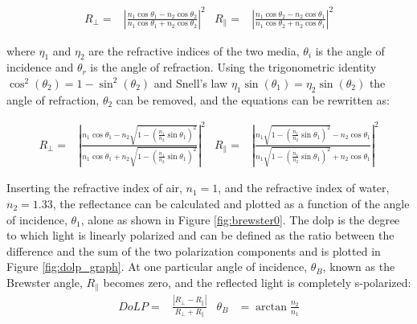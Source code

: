 \begin{align}
    R_\perp =     & \left|{\frac {n_{1}\cos \theta _1-n_{2}\cos \theta _2}{n_{1}\cos \theta _1+n_{2}\cos \theta _2}}\right|^{2}
                  & 
    R_\parallel = & \left|{\frac {n_{1}\cos \theta _2-n_{2}\cos \theta _1}{n_{1}\cos \theta _2+n_{2}\cos \theta _1}}\right|^{2}
\end{align}

where $\eta_1$ and $\eta_2$ are the refractive indices of the two media,
$\theta_i$ is the angle of incidence and $\theta_r$ is the angle of refraction.
Using the trigonometric identity $ \cos^2{\left(\theta_2 \right)} = 1- \sin^2{\left(\theta_2 \right)}$ and Snell's law $\eta_1 \sin{\left(\theta_1 \right)} = \eta_2 \sin{\left(\theta_2 \right)}$ the angle of refraction, $\theta_2$ can be removed, and the equations can be rewritten as:

\begin{align}
    R_\perp =     & \left|{\frac {n_{1}\cos \theta _1-n_{2}{\sqrt {1-\left({\frac {n_{1}}{n_{2}}}\sin \theta _1\right)^{2}}}}{n_{1}\cos \theta _1+n_{2}{\sqrt {1-\left({\frac {n_{1}}{n_{2}}}\sin \theta _1\right)^{2}}}}}\right|^{2}
                  & 
    R_\parallel = & \left|{\frac {n_{1}{\sqrt {1-\left({\frac {n_{1}}{n_{2}}}\sin \theta _1\right)^{2}}}-n_{2}\cos \theta _1}{n_{1}{\sqrt {1-\left({\frac {n_{1}}{n_{2}}}\sin \theta _1\right)^{2}}}+n_{2}\cos \theta _1}}\right|^{2}
\end{align}


Inserting the refractive index of air, $n_1 = 1$, and the refractive index of water, $n_2 = 1.33$, the reflectance can be calculated and plotted as a function of the angle of incidence, $\theta_1$, alone as shown in Figure \ref{fig:brewster0}.
The \gls{dolp} is the degree to which light is linearly polarized and can be defined as the ratio between the difference and the sum of the two polarization components and is plotted in Figure \ref{fig:dolp_graph}.
At one particular angle of incidence, $\theta_B$, known as the Brewster angle, $R_\parallel$ becomes zero, and the reflected light is completely s-polarized:
\begin{align}
    DoLP= & \frac{\left | R_\perp - R_\parallel \right |}{R_\perp + R_\parallel} & \theta_B & = \arctan{\frac{n_2}{n_1}}
\end{align}

